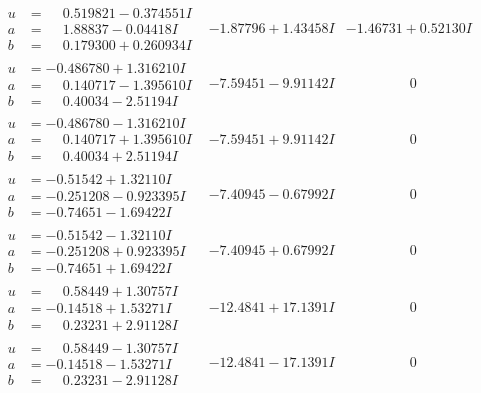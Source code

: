\documentclass[1p]{elsarticle_modified}
\theoremstyle{definition}
\begin{document}
$$\begin{array}{c|c|c}
\begin{aligned}
u &= \phantom{-}0.519821 - 0.374551 I \\
a &= \phantom{-}1.88837 - 0.04418 I \\
b &= \phantom{-}0.179300 + 0.260934 I\end{aligned}
 & -1.87796 + 1.43458 I & -1.46731 + 0.52130 I \\ \hline\begin{aligned}
u &= -0.486780 + 1.316210 I \\
a &= \phantom{-}0.140717 - 1.395610 I \\
b &= \phantom{-}0.40034 - 2.51194 I\end{aligned}
 & -7.59451 - 9.91142 I & \phantom{-0.000000 } 0 \\ \hline\begin{aligned}
u &= -0.486780 - 1.316210 I \\
a &= \phantom{-}0.140717 + 1.395610 I \\
b &= \phantom{-}0.40034 + 2.51194 I\end{aligned}
 & -7.59451 + 9.91142 I & \phantom{-0.000000 } 0 \\ \hline\begin{aligned}
u &= -0.51542 + 1.32110 I \\
a &= -0.251208 - 0.923395 I \\
b &= -0.74651 - 1.69422 I\end{aligned}
 & -7.40945 - 0.67992 I & \phantom{-0.000000 } 0 \\ \hline\begin{aligned}
u &= -0.51542 - 1.32110 I \\
a &= -0.251208 + 0.923395 I \\
b &= -0.74651 + 1.69422 I\end{aligned}
 & -7.40945 + 0.67992 I & \phantom{-0.000000 } 0 \\ \hline\begin{aligned}
u &= \phantom{-}0.58449 + 1.30757 I \\
a &= -0.14518 + 1.53271 I \\
b &= \phantom{-}0.23231 + 2.91128 I\end{aligned}
 & -12.4841 + 17.1391 I & \phantom{-0.000000 } 0 \\ \hline\begin{aligned}
u &= \phantom{-}0.58449 - 1.30757 I \\
a &= -0.14518 - 1.53271 I \\
b &= \phantom{-}0.23231 - 2.91128 I\end{aligned}
 & -12.4841 - 17.1391 I & \phantom{-0.000000 } 0\\

\end{array}$$
\end{document}
